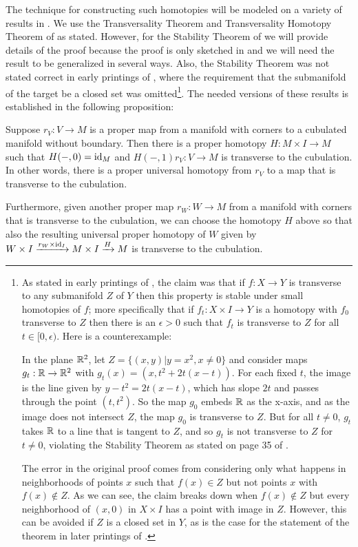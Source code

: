 The technique for constructing such homotopies will be modeled on a variety of results in \cite{GuPo74}.
We use the Transversality Theorem and Transversality Homotopy Theorem of \cite[Section 2.3]{GuPo74} as stated.
However, for the Stability Theorem of \cite[Section 1.6]{GuPo74} we will provide details of the proof because the proof is only sketched in \cite{GuPo74} and we will need the result to be generalized in several ways.
Also, the Stability Theorem was not stated correct in early printings of \cite{GuPo74}, where the requirement that the submanifold of the target be a closed set was omitted\footnote{As stated in early printings of \cite{GuPo74}, the claim was that if $f \colon X \to Y$ is transverse to any submanifold $Z$ of $Y$ then this property is stable under small homotopies of $f$; more specifically that if $f_t:X \times I \to Y$ is a homotopy with $f_0$ transverse to $Z$ then there is an $\epsilon>0$ such that $f_t$ is transverse to $Z$ for all $t\in[0,\epsilon)$.
	Here is a counterexample:

	In the plane $\mathbb{R}^2$, let $Z = \{(x,y)|y = x^2, x\neq 0\}$ and consider maps $g_t: \mathbb{R} \to \mathbb{R}^2$ with
	$g_t(x) = (x,t^2+2t(x-t))$.
	For each fixed $t$, the image is the line given by $y-t^2 = 2t(x-t)$, which has slope $2t$ and passes through the point $(t,t^2)$.
	So the map $g_0$ embeds $\mathbb{R}$ as the x-axis, and as the image does not intersect $Z$, the map $g_0$ is transverse to $Z$.
	But for all $t\neq 0$, $g_t$ takes $\mathbb{R}$ to a line that is tangent to $Z$, and so $g_t$ is not transverse to $Z$ for $t\neq 0$, violating the Stability Theorem as stated on page 35 of \cite{GuPo74}.

	The error in the original proof comes from considering only what happens in neighborhoods of points $x$ such that $f(x) \in Z$ but not points $x$ with $f(x)\notin Z$.
	As we can see, the claim breaks down when $f(x)\notin Z$ but every neighborhood of $(x,0)$ in $X \times I$ has a point with image in $Z$.
	However, this can be avoided if $Z$ is a closed set in $Y$, as is the case for the statement of the theorem in later printings of \cite{GuPo74}.}.
The needed versions of these results is established in the following proposition:

\begin{proposition}\label{P: ball stability}
	Suppose $r_V \colon V \to M$ is a proper map from a manifold with corners to a cubulated manifold without boundary.
	Then there is a proper homotopy $H \colon M \times I \to M$ such that $H(-,0) = \mathrm{id}_M$ and $H(-,1) r_V \colon V \to M$ is transverse to the cubulation.
	In other words, there is a proper universal homotopy from $r_V$ to a map that is transverse to the cubulation.

	Furthermore, given another proper map $r_W \colon W \to M$ from a manifold with corners that is transverse to the cubulation, we can choose the homotopy $H$ above so that also the resulting universal proper homotopy of $W$ given by $W \times I \xrightarrow{r_W \times \mathrm{id}_I} M \times I \xrightarrow{H} M$ is transverse to the cubulation.
\end{proposition}

